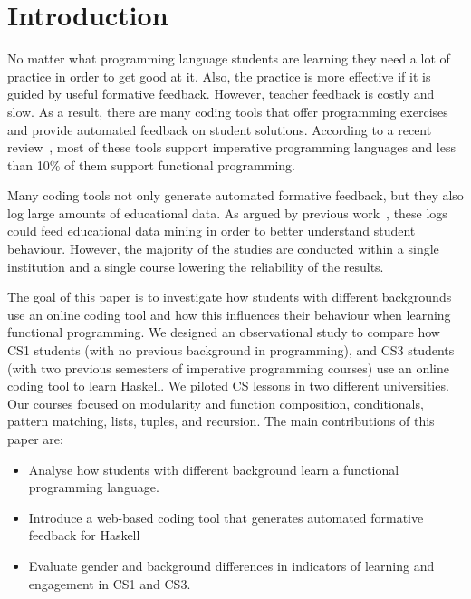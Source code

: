 \section{Introduction} \label{introduction} 



No matter what programming language students are learning they need a lot of practice in order to get good at it. Also, the practice is more effective if it is guided by useful formative feedback. However, teacher feedback is costly and slow. As a result, there are many coding tools that offer programming exercises and provide automated feedback
on student solutions. According to a recent review~\cite{Keuning:2016}, most of these tools support imperative programming languages and less than 10\% of them support functional programming. 

Many coding tools not only generate automated formative feedback, but they also log large amounts of educational data. As argued by previous work~\cite{Ihantola:2015}, these logs could feed educational data mining in order to better understand student behaviour. However, the majority of the studies are conducted within a single institution and a single course lowering the reliability of the results.

The goal of this paper is to investigate how students with different backgrounds use an online coding tool and how this influences their behaviour when learning functional programming. We designed an observational study to compare how CS1 students (with no previous background in programming), and CS3 students (with two previous semesters of imperative programming courses) use an online coding tool to learn Haskell. We piloted CS lessons in two different universities. Our courses focused on modularity and function composition, conditionals, pattern matching, lists, tuples, and recursion. %
The main contributions of this paper are:
\begin{itemize}
\setlength\itemsep{0pt}
\setlength{\parskip}{0pt}
\item Analyse how students with different background learn a functional programming language. 
\item Introduce a web-based coding tool that generates automated formative feedback for Haskell 
\item Evaluate gender and background differences in indicators of learning and engagement in CS1 and CS3. 
\end{itemize}

